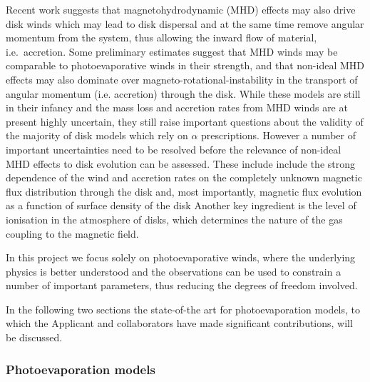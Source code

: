 \documentclass[10pt,fleqn,twoside]{article}
\begin{document}
Recent work suggests that magnetohydrodynamic (MHD) effects may also
drive disk winds 
\citep[e.g.,][]{2013ApJ...769...76B}
which may lead to disk
dispersal and at the same time remove angular momentum from the
system, thus allowing the inward flow of material, i.e.\ accretion. 
Some preliminary estimates suggest that MHD winds may be 
comparable to photoevaporative winds in their strength, and that
non-ideal MHD effects may also dominate over
magneto-rotational-instability  \citep[MRI, ]{1991ApJ...376..214B} in the transport of
angular momentum (i.e. accretion) through the disk. 
While these models are still in their infancy and the
mass loss and accretion rates from MHD winds are at present highly
uncertain, they still raise important questions about the validity of
the majority of 
disk models which rely on $\alpha$ prescriptions. However a number of
important uncertainties need to be resolved before the relevance of
non-ideal MHD effects to disk evolution can be assessed. These include
include the strong dependence of the wind and
accretion rates on the completely unknown magnetic flux distribution
through the disk and, most importantly, magnetic flux evolution as a
function of surface density of the disk 
\citep[e.g.\ discussion in][]{2013ApJ...778L..14A} 
Another key ingredient is the level of ionisation in the
atmosphere of disks, which determines the nature of the gas coupling to
the magnetic field. 

In this project we focus solely on photoevaporative winds, where the
underlying physics is better understood and the observations can be
used to constrain a number of important parameters, thus reducing the
degrees of freedom involved. 

In the following two sections the state-of-the art for photoevaporation
models, to which the Applicant and collaborators have made significant contributions, will be discussed.
 
\subsubsection{Photoevaporation models} 
\end{document}
